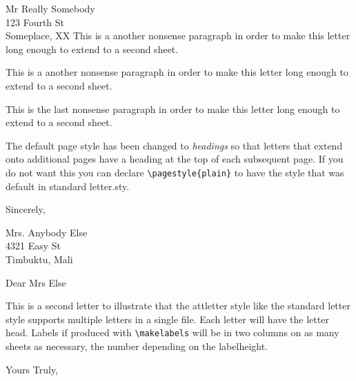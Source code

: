 \begin{letter}{Mr Really Somebody\\123 Fourth St\\Someplace, XX}
This is a another nonsense paragraph in order to make this letter long enough
to extend to a second sheet.

This is a another nonsense paragraph in order to make this letter long enough
to extend to a second sheet.

This is the last nonsense paragraph in order to make this letter long enough
to extend to a second sheet.

The default page style has been changed to {\it headings} so that
letters that extend onto additional pages have a heading at the top of
each subsequent page.  If you do not want this you can declare
\verb|\pagestyle{plain}| to have the style that was default in
standard letter.sty.

\closing{Sincerely,}
\end{letter}
\begin{letter}{Mrs. Anybody Else\\4321 Easy St\\Timbuktu, Mali}
\opening{Dear Mrs Else}
This is a second letter to illustrate that the attletter style like
the standard letter style supports multiple letters in a single file.
Each letter will have the letter head.  Labels if produced with
\verb|\makelabels| will be in two columns on as many sheets as
necessary, the number depending on the labelheight.
\closing{Yours Truly,}
\end{letter}


